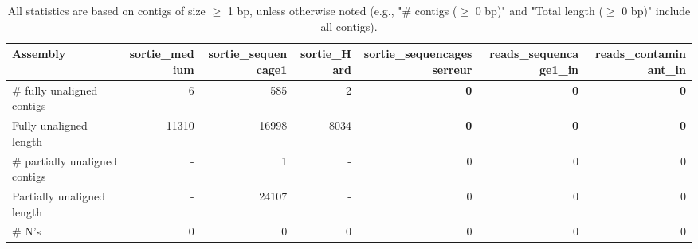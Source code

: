 \documentclass[12pt,a4paper]{article}
\begin{document}
\begin{table}[ht]
\begin{center}
\caption{All statistics are based on contigs of size $\geq$ 1 bp, unless otherwise noted (e.g., "\# contigs ($\geq$ 0 bp)" and "Total length ($\geq$ 0 bp)" include all contigs).}
\begin{tabular}{|l*{6}{|r}|}
\hline
Assembly & sortie\_medium & sortie\_sequencage1 & sortie\_Hard & sortie\_sequencagesserreur & reads\_sequencage1\_in & reads\_contaminant\_in \\ \hline
\# fully unaligned contigs & 6 & 585 & 2 & {\bf 0} & {\bf 0} & {\bf 0} \\ \hline
Fully unaligned length & 11310 & 16998 & 8034 & {\bf 0} & {\bf 0} & {\bf 0} \\ \hline
\# partially unaligned contigs & - & 1 & - & 0 & 0 & 0 \\ \hline
Partially unaligned length & - & 24107 & - & 0 & 0 & 0 \\ \hline
\# N's & 0 & 0 & 0 & 0 & 0 & 0 \\ \hline
\end{tabular}
\end{center}
\end{table}
\end{document}
